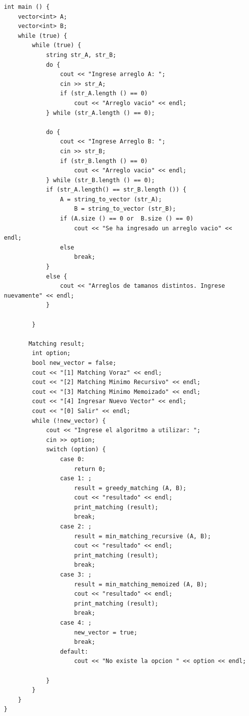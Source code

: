 \documentclass{article}
\begin{document}
\begin{lstlisting}
int main () {
    vector<int> A;
    vector<int> B;
    while (true) {
        while (true) {
            string str_A, str_B;
            do {
                cout << "Ingrese arreglo A: ";
                cin >> str_A;
                if (str_A.length () == 0)
                    cout << "Arreglo vacio" << endl;
            } while (str_A.length () == 0);

            do {
                cout << "Ingrese Arreglo B: ";
                cin >> str_B;
                if (str_B.length () == 0)
                    cout << "Arreglo vacio" << endl;
            } while (str_B.length () == 0);
            if (str_A.length() == str_B.length ()) {
                A = string_to_vector (str_A);
                    B = string_to_vector (str_B);
                if (A.size () == 0 or  B.size () == 0)
                    cout << "Se ha ingresado un arreglo vacio" << endl;
                else
                    break;
            }
            else {
                cout << "Arreglos de tamanos distintos. Ingrese nuevamente" << endl;
            }

        }

       Matching result;
        int option;
        bool new_vector = false;
        cout << "[1] Matching Voraz" << endl;
        cout << "[2] Matching Minimo Recursivo" << endl;
        cout << "[3] Matching Minimo Memoizado" << endl;
        cout << "[4] Ingresar Nuevo Vector" << endl;
        cout << "[0] Salir" << endl;
        while (!new_vector) {
            cout << "Ingrese el algoritmo a utilizar: ";
            cin >> option;
            switch (option) {
                case 0:
                    return 0;
                case 1: ;
                    result = greedy_matching (A, B);
                    cout << "resultado" << endl;
                    print_matching (result);
                    break;
                case 2: ;
                    result = min_matching_recursive (A, B);
                    cout << "resultado" << endl;
                    print_matching (result);
                    break;
                case 3: ;
                    result = min_matching_memoized (A, B);
                    cout << "resultado" << endl;
                    print_matching (result);
                    break;
                case 4: ;
                    new_vector = true;
                    break;
                default:
                    cout << "No existe la opcion " << option << endl;

            }
        }
    }
}

\end{lstlisting}
\end{document}
